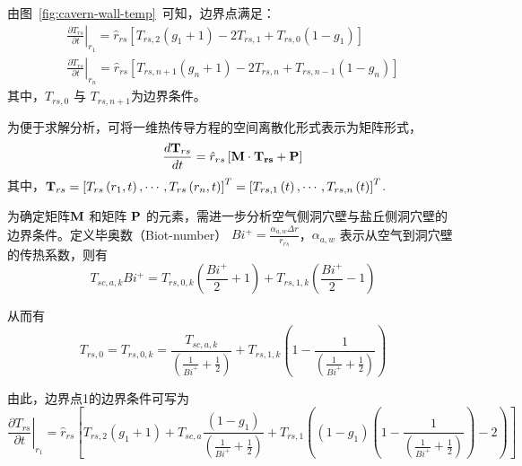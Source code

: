 由图~\ref{fig:cavern-wall-temp}~可知，边界点满足\cite{Cavern-wall-09,Model-AA-CAES-10}：
\begin{subequations}
\begin{gather}
    {\left. {\frac{{\partial {T_{rs}}}}{{\partial t}}} \right|_{{r_1}}} = {\hat r_{rs}}\left[ {{T_{rs,2}}\left( {{g_1} + 1} \right) - 2{T_{rs,1}} + {T_{rs,0}}\left( {1 - {g_1}} \right)} \right]\\
    {\left. {\frac{{\partial {T_{rs}}}}{{\partial t}}} \right|_{{r_n}}} = {\hat r_{rs}}\left[ {{T_{rs,n + 1}}\left( {{g_n} + 1} \right) - 2{T_{rs,n}} + {T_{rs,n - 1}}\left( {1 - {g_n}} \right)} \right]
\end{gather}
\end{subequations}
其中，${T_{rs,0}}$ 与 ${T_{rs,n + 1}}$为边界条件。

为便于求解分析，可将一维热传导方程的空间离散化形式表示为矩阵形式\cite{Model-AA-CAES-10}，
\begin{equation}
\frac{{d{{\bf{T}}_{rs}}}}{{dt}} = {\hat r_{rs}}\left[ {{\bf{M}} \cdot {{\bf{T}}_{{\bf{rs}}}} + {\bf{P}}} \right]
\end{equation}
其中，${{\bf{T}}_{rs}} = {\left[ {{T_{rs}}\left( {{r_1},t} \right), \cdots ,{T_{rs}}\left( {{r_n},t} \right)} \right]^T} = {\left[ {{T_{rs,1}}\left( t \right), \cdots ,{T_{rs,n}}\left( t \right)} \right]^T}$.

为确定矩阵${\bf{M}}$ 和矩阵 ${\bf{P}}$ 的元素，需进一步分析空气侧洞穴壁与盐丘侧洞穴壁的边界条件。定义毕奥数（Biot-number） $B{i^ + } = \frac{{{\alpha _{a,w}}\Delta r}}{{{r_{rs}}}}$，${\alpha _{a,w}}$ 表示从空气到洞穴壁的传热系数，则有\cite{Cavern-wall-09,Model-AA-CAES-10}
\begin{equation}
{T_{sc,a,k}}B{i^ + } = {T_{rs,0,k}}({\frac{{B{i^ + }}}{2} + 1}) + {T_{rs,1,k}}({\frac{{B{i^ + }}}{2} - 1})
\end{equation}

从而有
\begin{equation}
{T_{rs,0}} = {T_{rs,0,k}} = \frac{{{T_{sc,a,k}}}}{{({\frac{1}{{B{i^ + }}} + \frac{1}{2}})}} + {T_{rs,1,k}}({1 -\frac{1}{{({\frac{1}{{B{i^ + }}} + \frac{1}{2}})}}})
\end{equation}

由此，边界点1的边界条件可写为
\begin{equation}
{\left. {\frac{{\partial {T_{rs}}}}{{\partial t}}} \right|_{{r_1}}} = {\hat r_{rs}}\left[ {{T_{rs,2}}\left( {{g_1} + 1} \right) + {T_{sc,a}}\frac{{\left( {1 - {g_1}} \right)}}{{\left( {\frac{1}{{B{i^ + }}} + \frac{1}{2}} \right)}} + {T_{rs,1}}({\left( {1 - {g_1}} \right)({1 - \frac{1}{{\left( {\frac{1}{{B{i^ + }}} + \frac{1}{2}} \right)}}}) - 2})} \right]
\end{equation}

